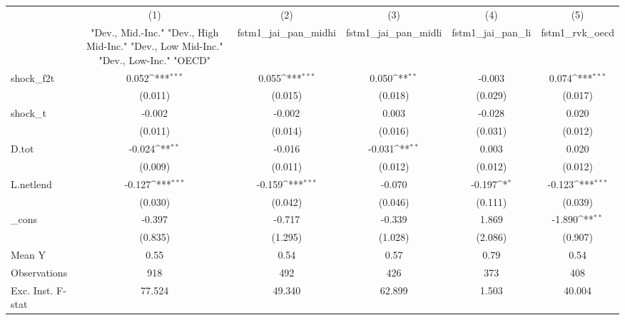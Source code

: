 {
\def\sym#1{\ifmmode^{#1}\else\(^{#1}\)\fi}
\begin{tabular}{l*{5}{c}}
\toprule
            &\multicolumn{1}{c}{(1)}&\multicolumn{1}{c}{(2)}&\multicolumn{1}{c}{(3)}&\multicolumn{1}{c}{(4)}&\multicolumn{1}{c}{(5)}\\
            &\multicolumn{1}{c}{ "Dev., Mid.-Inc." "Dev., High Mid-Inc." "Dev., Low Mid-Inc." "Dev., Low-Inc." "OECD" }&\multicolumn{1}{c}{fstm1\_jai\_pan\_midhi}&\multicolumn{1}{c}{fstm1\_jai\_pan\_midli}&\multicolumn{1}{c}{fstm1\_jai\_pan\_li}&\multicolumn{1}{c}{fstm1\_rvk\_oecd}\\
\midrule
shock\_f2t   &       0.052\sym{***}&       0.055\sym{***}&       0.050\sym{**} &      -0.003         &       0.074\sym{***}\\
            &     (0.011)         &     (0.015)         &     (0.018)         &     (0.029)         &     (0.017)         \\
\addlinespace
shock\_t     &      -0.002         &      -0.002         &       0.003         &      -0.028         &       0.020         \\
            &     (0.011)         &     (0.014)         &     (0.016)         &     (0.031)         &     (0.012)         \\
\addlinespace
D.tot       &      -0.024\sym{**} &      -0.016         &      -0.031\sym{**} &       0.003         &       0.020         \\
            &     (0.009)         &     (0.011)         &     (0.012)         &     (0.012)         &     (0.012)         \\
\addlinespace
L.netlend   &      -0.127\sym{***}&      -0.159\sym{***}&      -0.070         &      -0.197\sym{*}  &      -0.123\sym{***}\\
            &     (0.030)         &     (0.042)         &     (0.046)         &     (0.111)         &     (0.039)         \\
\addlinespace
\_cons      &      -0.397         &      -0.717         &      -0.339         &       1.869         &      -1.890\sym{**} \\
            &     (0.835)         &     (1.295)         &     (1.028)         &     (2.086)         &     (0.907)         \\
\midrule
Mean Y      &        0.55         &        0.54         &        0.57         &        0.79         &        0.54         \\
Observations&         918         &         492         &         426         &         373         &         408         \\
Exc. Inst. F-stat&      77.524         &      49.340         &      62.899         &       1.503         &      40.004         \\
\bottomrule
\end{tabular}
}
